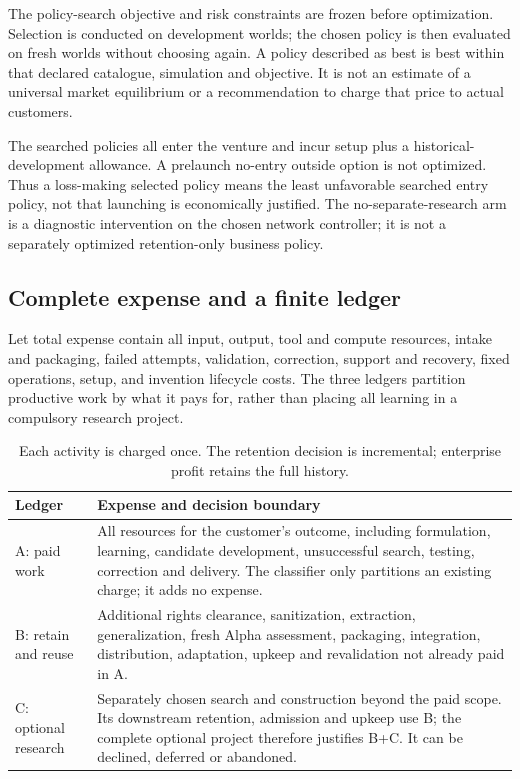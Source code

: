 \documentclass[11pt,a4paper]{article}
\begin{document}
The policy-search objective and risk constraints are frozen before optimization. Selection is conducted on development worlds; the chosen policy is then evaluated on fresh worlds without choosing again. A policy described as best is best within that declared catalogue, simulation and objective. It is not an estimate of a universal market equilibrium or a recommendation to charge that price to actual customers.

The searched policies all enter the venture and incur setup plus a historical-development allowance. A prelaunch no-entry outside option is not optimized. Thus a loss-making selected policy means the least unfavorable searched entry policy, not that launching is economically justified. The no-separate-research arm is a diagnostic intervention on the chosen network controller; it is not a separately optimized retention-only business policy.

\subsection{Complete expense and a finite ledger}

Let total expense contain all input, output, tool and compute resources, intake and packaging, failed attempts, validation, correction, support and recovery, fixed operations, setup, and invention lifecycle costs. The three ledgers partition productive work by what it pays for, rather than placing all learning in a compulsory research project.

\begin{table}[!htbp]\centering\small
\caption{Each activity is charged once. The retention decision is incremental; enterprise profit retains the full history.}
\begin{tabularx}{\linewidth}{p{.18\linewidth}Y}\toprule
Ledger & Expense and decision boundary\\\midrule
A: paid work & All resources for the customer's outcome, including formulation, learning, candidate development, unsuccessful search, testing, correction and delivery. The classifier only partitions an existing charge; it adds no expense.\\
B: retain and reuse & Additional rights clearance, sanitization, extraction, generalization, fresh Alpha assessment, packaging, integration, distribution, adaptation, upkeep and revalidation not already paid in A.\\
C: optional research & Separately chosen search and construction beyond the paid scope. Its downstream retention, admission and upkeep use B; the complete optional project therefore justifies B+C. It can be declined, deferred or abandoned.\\\bottomrule
\end{tabularx}\end{table}
\end{document}

